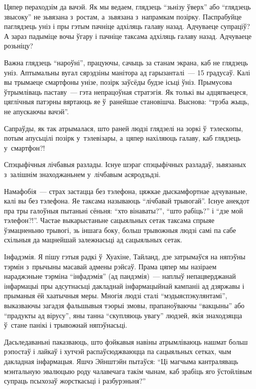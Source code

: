 Цяпер пераходзім да вачэй. Як мы ведаем, глядзець ``зьнізу ўверх'' або ``глядзець звысоку'' не зьвязана з~ростам, а~зьвязана з~напрамкам позірку. Паспрабуйце паглядзець уніз і пры гэтым пачніце адхіляць галаву назад. Адчуваеце супраціў? А зараз падыміце вочы ўгару і пачніце таксама адхіляць галаву назад. Адчуваеце розьніцу?

Важна глядзець ``нароўні'', працуючы, сачыць за станам экрана, каб не глядзець уніз. Аптымальны вугал сярэдзіны манітора ад гарызанталі~--- 15 градусаў. Калі вы трымаеце смартфоны унізе, позірк заўсёды будзе ісьці ўніз. Прымусова ўтрымліваць паставу~--- гэта непрацоўная стратэгія. Як толькі вы адцягваецеся, цяглічныя патэрны вяртаюць яе ў~ранейшае становішча. Выснова: ``трэба жыць, не апускаючы вачэй''.

Сапраўды, як так атрымалася, што раней людзі глядзелі на зоркі ў~тэлескопы, потым апусьцілі позірк у~тэлевізары, а~цяпер нахіляюць галаву, каб глядзець у~смартфон?!

Спэцыфічныя лічбавыя разлады. Існуе шэраг спэцыфічных разладаў, зьвязаных з~залішнім знаходжаньнем у~лічбавым асяродзьдзі.

Намафобія~--- страх застацца без тэлефона, цяжкае дыскамфортнае адчуваньне, калі вы без тэлефона. Яе таксама называюць ``лічбавай трывогай''. Існуе анекдот пра тры галоўныя пытаньні сёньня: ``хто вінаваты?'', ``што рабіць?'' і ``дзе мой тэлефон?!''. Частае выкарыстаньне сацыяльных сетак таксама спрыяе ўзмацненьню трывогі, зь іншага боку, больш трывожныя людзі самі па сабе схільныя да мацнейшай залежнасьці ад сацыяльных сетак.

Інфадэмія. Я пішу гэтыя радкі ў~Хуахіне, Тайланд, дзе затрымаўся на няпэўны тэрмін з~прычыны масавай адмены рэйсаў. Прама цяпер мы назіраем нараджэньне тэрміна ``інфадэмія'' (ад пандэмія)~--- наплыў непацверджанай інфармацыі пры адсутнасьці дакладнай інфармацыйнай кампаніі ад дзяржавы і прыманыя ёй хаатычныя меры. Многія людзі сталі ``мэдыяспэкулянтамі'', выказваючы загадзя фальшывыя тэорыі змовы, прапаноўваючы ``вакцыны'' або ``прадукты ад вірусу'', яны танна ``скупляюць увагу'' людзей, якія знаходзяцца ў~стане панікі і трывожнай няпэўнасьці.

Дасьледаваньні паказваюць, што фэйкавыя навіны атрымліваюць нашмат больш рэпостаў і лайкаў і хутчэй распаўсюджваюцца па сацыяльных сетках, чым дакладная інфармацыя. Яшчэ Эйнштэйн пытаўся: ``Ці магчыма кантраляваць мэнтальную эвалюцыю роду чалавечага такім чынам, каб зрабіць яго ўстойлівым супраць псыхозаў жорсткасьці і разбурэньня?'' 

